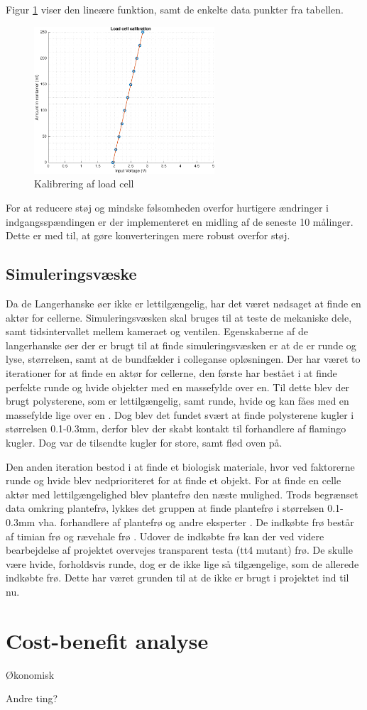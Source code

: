 Figur \ref{fig:loadcellcalib} viser den lineære funktion, samt de enkelte data punkter fra tabellen. 
\begin{figure}[H]
	\centering
	\includegraphics[width=0.6\textwidth]{billeder/software/calibration-crop.pdf}
	\caption{Kalibrering af load cell}
	\label{fig:loadcellcalib}
\end{figure}

For at reducere støj og mindske følsomheden overfor hurtigere ændringer i indgangsspændingen er der implementeret en midling af de seneste 10 målinger. Dette er med til, at gøre konverteringen mere robust overfor støj. 

\subsection{Simuleringsvæske}
Da de Langerhanske øer ikke er lettilgængelig, har det været nødsaget at finde en aktør for cellerne. Simuleringsvæsken skal bruges til at teste de mekaniske dele, samt tidsintervallet mellem kameraet og ventilen. Egenskaberne af de langerhanske øer der er brugt til at finde simuleringsvæsken er at de er runde og lyse, størrelsen, samt at de bundfælder i colleganse opløsningen. Der har været to iterationer for at finde en aktør for cellerne, den første har bestået i at finde perfekte runde og hvide objekter med en massefylde over en. Til dette blev der brugt polysterene, som er lettilgængelig, samt runde, hvide og kan fåes med en massefylde lige over en . Dog blev det fundet svært at finde polysterene kugler i størrelsen 0.1-0.3mm, derfor blev der skabt kontakt til forhandlere af flamingo kugler. Dog var de tilsendte kugler for store, samt flød oven på. 

Den anden iteration bestod i at finde et biologisk materiale, hvor ved faktorerne runde og hvide blev nedprioriteret for at finde et objekt. For at finde en celle aktør med lettilgængelighed blev plantefrø den næste mulighed. Trods begrænset data omkring plantefrø, lykkes det gruppen at finde plantefrø i størrelsen 0.1-0.3mm vha. forhandlere af plantefrø og andre eksperter . De indkøbte frø består af timian frø og rævehale frø . Udover de indkøbte frø kan der ved videre bearbejdelse af projektet overvejes transparent testa (tt4 mutant) frø. De skulle være hvide, forholdsvis runde, dog er de ikke lige så tilgængelige, som de allerede indkøbte frø. Dette har været grunden til at de ikke er brugt i projektet ind til nu. 
 

\section{Cost-benefit analyse}
Økonomisk






Andre ting?